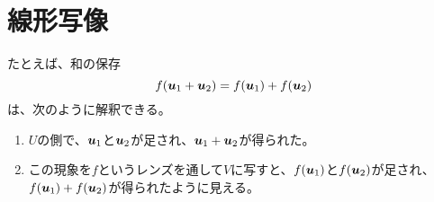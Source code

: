 \documentclass[../../../topic_linear-algebra]{subfiles}
\begin{document}
\sectionline
\section{線形写像}

たとえば、和の保存
\begin{equation*}
  f(\vb*{u}_1 + \vb*{u}_2) = f(\vb*{u}_1) + f(\vb*{u}_2)
\end{equation*}
は、次のように解釈できる。

\begin{enumerate}
  \item $U$の側で、$\vb*{u}_1$と$\vb*{u}_2$が足され、$\vb*{u}_1 + \vb*{u}_2$が得られた。
  \item この現象を$f$というレンズを通して$V$に写すと、$f(\vb*{u}_1)$と$f(\vb*{u}_2)$が足され、$f(\vb*{u}_1) + f(\vb*{u}_2)$が得られたように見える。
\end{enumerate}
\end{document}
